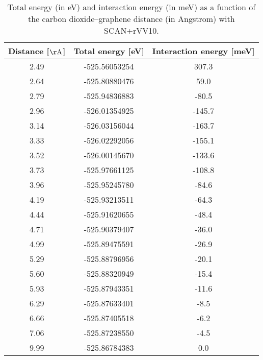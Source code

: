\begin{table}[h]
\centering
\begin{tabular}{ccc}
\hline
Distance [$\mathrm{\AA}$] & Total energy [eV] & Interaction energy [meV] \\
\hline
2.49 & -525.56053254 & 307.3 \\
2.64 & -525.80880476 & 59.0 \\
2.79 & -525.94836883 & -80.5 \\
2.96 & -526.01354925 & -145.7 \\
3.14 & -526.03156044 & -163.7 \\
3.33 & -526.02292056 & -155.1 \\
3.52 & -526.00145670 & -133.6 \\
3.73 & -525.97661125 & -108.8 \\
3.96 & -525.95245780 & -84.6 \\
4.19 & -525.93213511 & -64.3 \\
4.44 & -525.91620655 & -48.4 \\
4.71 & -525.90379407 & -36.0 \\
4.99 & -525.89475591 & -26.9 \\
5.29 & -525.88796956 & -20.1 \\
5.60 & -525.88320949 & -15.4 \\
5.93 & -525.87943351 & -11.6 \\
6.29 & -525.87633401 & -8.5 \\
6.66 & -525.87405518 & -6.2 \\
7.06 & -525.87238550 & -4.5 \\
9.99 & -525.86784383 & 0.0 \\
\hline
\end{tabular}
\caption{Total energy (in eV) and interaction energy (in meV) as a function of the carbon dioxide--graphene distance (in Angstrom) with SCAN+rVV10.}
\label{SI_dft_table_SCAN+rVV10}
\end{table}